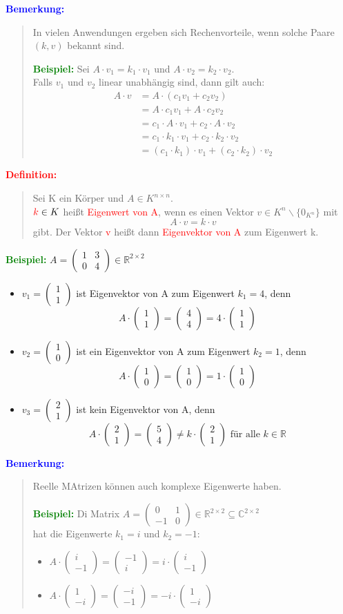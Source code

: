 \documentclass{article}
\newcommand{\red}[1]{\textcolor{red}{#1}}
\newcommand{\blue}[1]{\textcolor{blue}{#1}}
\newcommand{\green}[1]{\textcolor{green}{#1}}
\newcommand{\ex}{\green{\textbf{Beispiel: }}}
\newcommand{\de}[1]{\red{\textbf{Definition: }}\begin{quote}#1\end{quote}}
\newcommand{\an}[1]{\blue{\textbf{Bemerkung: }}\begin{quote}#1\end{quote}}
\newcommand{\R}{\mathbb{R}}
\newcommand{\C}{\mathbb{C}}
\newcommand{\vvec}[2]{\begin{pmatrix}#1\\#2\end{pmatrix}}
\begin{document}
\an{
    In vielen Anwendungen ergeben sich Rechenvorteile, wenn solche Paare $(k, v)$ bekannt sind.

    \ex Sei $A \cdot v_1 = k_1 \cdot v_1$ und $A \cdot v_2 = k_2 \cdot v_2$.\\
    Falls $v_1$ und $v_2$ linear unabhängig sind, dann gilt auch:
    \begin{align*}
        A \cdot v &= A \cdot (c_1 v_1 + c_2 v_2)\\
        &= A \cdot c_1 v_1 + A \cdot c_2 v_2\\
        &= c_1 \cdot A \cdot v_1 + c_2 \cdot A \cdot v_2\\
        &= c_1 \cdot k_1 \cdot v_1 + c_2 \cdot k_2 \cdot v_2\\
        &= (c_1 \cdot k_1) \cdot v_1 + (c_2 \cdot k_2) \cdot v_2
    \end{align*}
}

\de{
    Sei K ein Körper und $A \in K^{n \times n}$.\\
    $\red{k} \in K$ heißt \red{Eigenwert von A}, wenn es einen Vektor $v \in K^n \backslash \{0_{K^n}\}$ mit
    \[
        A \cdot v = k \cdot v
    \]
    gibt. Der Vektor \red{v} heißt dann \red{Eigenvektor von A} zum Eigenwert k.
}

\newpage
\ex $A = \begin{pmatrix}
    1 & 3\\
    0 & 4
\end{pmatrix} \in \R^{2 \times 2}$
\begin{itemize}
    \item $v_1 = \vvec{1}{1}$ ist Eigenvektor von A zum Eigenwert $k_1 = 4$, denn
    \[
        A \cdot \vvec{1}{1} = \vvec{4}{4} = 4 \cdot \vvec{1}{1}
    \]
    \item $v_2 = \vvec{1}{0}$ ist ein Eigenvektor von A zum Eigenwert $k_2 = 1$, denn
    \[
        A \cdot \vvec{1}{0} = \vvec{1}{0} = 1 \cdot \vvec{1}{0}
    \]
    \item $v_3 = \vvec{2}{1}$ ist kein Eigenvektor von A, denn
    \[
        A \cdot \vvec{2}{1} = \vvec{5}{4} \ne k \cdot \vvec{2}{1} \text{ für alle } k \in \R 
    \]
\end{itemize}

\an{
    Reelle MAtrizen können auch komplexe Eigenwerte haben.

    \ex Di Matrix $A = \begin{pmatrix}
        0 & 1\\
        -1 & 0
    \end{pmatrix} \in \R^{2 \times 2} \subseteq \C^{2 \times 2}$\\
    hat die Eigenwerte $k_1 = i$ und $k_2 = -1$:
    \begin{itemize}
        \item $A \cdot \vvec{i}{-1} = \vvec{-1}{i} = i \cdot \vvec{i}{-1}$
        \item $A \cdot \vvec{1}{-i} = \vvec{-i}{-1} = -i \cdot \vvec{1}{-i}$
    \end{itemize}
}
\end{document}

